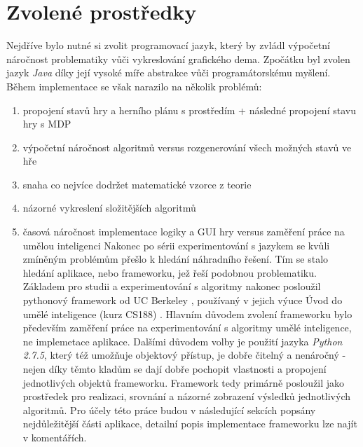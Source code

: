 \section{Zvolené prostředky}
Nejdříve bylo nutné si zvolit programovací jazyk, který by zvládl výpočetní náročnost problematiky vůči vykreslování grafického dema. Zpočátku byl zvolen jazyk \textit{Java} díky její vysoké míře abstrakce vůči programátorskému myšlení. Během implementace se však narazilo na několik problémů: 
\begin{enumerate}
\item propojení stavů hry a herního plánu s prostředím + následné propojení stavu hry s MDP
\item výpočetní náročnost algoritmů versus rozgenerování všech možných stavů ve hře
\item snaha co nejvíce dodržet matematické vzorce z teorie
\item názorné vykreslení složitějších algoritmů
\item časová náročnost implementace logiky a GUI hry versus zaměření práce na umělou inteligenci
Nakonec po sérii experimentování s jazykem se kvůli zmíněným problémům přešlo k hledání náhradního řešení. Tím se stalo hledání aplikace, nebo frameworku, jež řeší podobnou problematiku. Základem pro studii a experimentování s algoritmy nakonec posloužil pythonový framework od UC Berkeley \cite{pacmanProjects}, používaný v jejich výuce Úvod do umělé inteligence (kurz CS188) \cite{berkeley}. Hlavním důvodem zvolení frameworku bylo především zaměření práce na experimentování s algoritmy umělé inteligence, ne implemetace aplikace. Dalšími důvodem volby je použití jazyka \textit{Python 2.7.5}, který též umožňuje objektový přístup, je dobře čitelný a nenáročný - nejen díky těmto kladům se dají dobře pochopit vlastnosti a propojení jednotlivých objektů frameworku. Framework tedy primárně posloužil jako prostředek pro realizaci, srovnání a názorné zobrazení výsledků jednotlivých algoritmů.
Pro účely této práce budou v následující sekcích popsány nejdůležitější části aplikace, detailní popis implementace frameworku lze najít v komentářích.


\end{enumerate}

